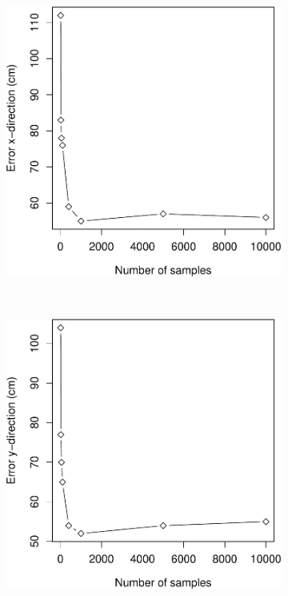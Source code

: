 \documentclass[11pt]{report}
\begin{document}
\begin{figure}[H]
  \centering
  \begin{subfigure}[b]{0.45\textwidth}
  \includegraphics[width=1\textwidth]{Error_x_samples-crop}
  \end{subfigure}%
~
  \begin{subfigure}[b]{0.45\textwidth}
  \includegraphics[width=1\textwidth]{Error_y_samples-crop}

\end{subfigure}
\end{figure}
\end{document}

